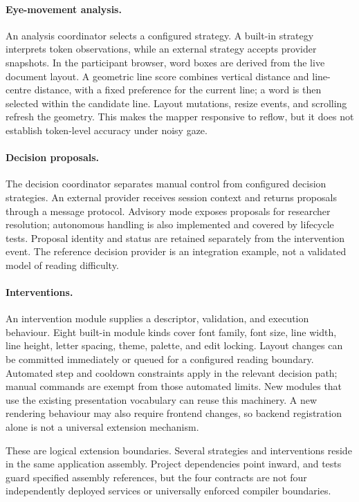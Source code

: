 \paragraph{Eye-movement analysis.}
An analysis coordinator selects a configured strategy. A built-in strategy interprets token observations, while an external strategy accepts provider snapshots. In the participant browser, word boxes are derived from the live document layout. A geometric line score combines vertical distance and line-centre distance, with a fixed preference for the current line; a word is then selected within the candidate line. Layout mutations, resize events, and scrolling refresh the geometry. This makes the mapper responsive to reflow, but it does not establish token-level accuracy under noisy gaze.

\paragraph{Decision proposals.}
The decision coordinator separates manual control from configured decision strategies. An external provider receives session context and returns proposals through a message protocol. Advisory mode exposes proposals for researcher resolution; autonomous handling is also implemented and covered by lifecycle tests. Proposal identity and status are retained separately from the intervention event. The reference decision provider is an integration example, not a validated model of reading difficulty.

\paragraph{Interventions.}
An intervention module supplies a descriptor, validation, and execution behaviour. Eight built-in module kinds cover font family, font size, line width, line height, letter spacing, theme, palette, and edit locking. Layout changes can be committed immediately or queued for a configured reading boundary. Automated step and cooldown constraints apply in the relevant decision path; manual commands are exempt from those automated limits. New modules that use the existing presentation vocabulary can reuse this machinery. A new rendering behaviour may also require frontend changes, so backend registration alone is not a universal extension mechanism.

These are logical extension boundaries. Several strategies and interventions reside in the same application assembly. Project dependencies point inward, and tests guard specified assembly references, but the four contracts are not four independently deployed services or universally enforced compiler boundaries.

